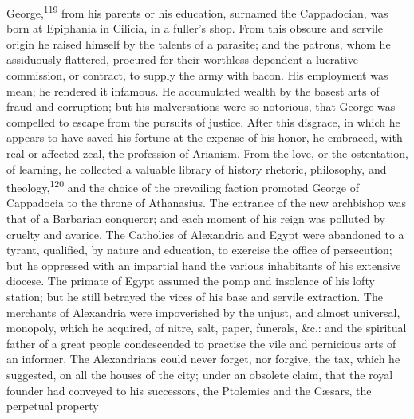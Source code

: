 

George,\textsuperscript{119} from his parents or his education, surnamed the
Cappadocian, was born at Epiphania in Cilicia, in a fuller’s
shop. From this obscure and servile origin he raised himself by
the talents of a parasite; and the patrons, whom he assiduously
flattered, procured for their worthless dependent a lucrative
commission, or contract, to supply the army with bacon. His
employment was mean; he rendered it infamous. He accumulated
wealth by the basest arts of fraud and corruption; but his
malversations were so notorious, that George was compelled to
escape from the pursuits of justice. After this disgrace, in
which he appears to have saved his fortune at the expense of his
honor, he embraced, with real or affected zeal, the profession of
Arianism. From the love, or the ostentation, of learning, he
collected a valuable library of history rhetoric, philosophy, and
theology,\textsuperscript{120} and the choice of the prevailing faction promoted
George of Cappadocia to the throne of Athanasius. The entrance of
the new archbishop was that of a Barbarian conqueror; and each
moment of his reign was polluted by cruelty and avarice. The
Catholics of Alexandria and Egypt were abandoned to a tyrant,
qualified, by nature and education, to exercise the office of
persecution; but he oppressed with an impartial hand the various
inhabitants of his extensive diocese. The primate of Egypt
assumed the pomp and insolence of his lofty station; but he still
betrayed the vices of his base and servile extraction. The
merchants of Alexandria were impoverished by the unjust, and
almost universal, monopoly, which he acquired, of nitre, salt,
paper, funerals, \&c.: and the spiritual father of a great people
condescended to practise the vile and pernicious arts of an
informer. The Alexandrians could never forget, nor forgive, the
tax, which he suggested, on all the houses of the city; under an
obsolete claim, that the royal founder had conveyed to his
successors, the Ptolemies and the Cæsars, the perpetual property
